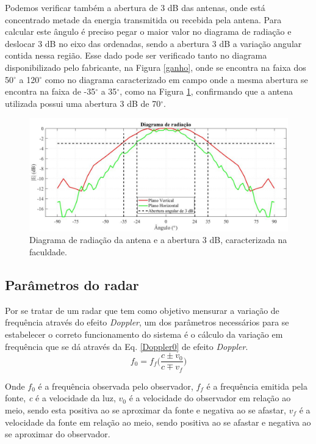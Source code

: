 Podemos verificar também a abertura de 3 dB das antenas, onde está concentrado metade da energia transmitida ou recebida pela antena. Para calcular este ângulo é preciso pegar o maior valor no diagrama de radiação e deslocar 3 dB no eixo das ordenadas, sendo a abertura 3 dB a variação angular contida nessa região. Esse dado pode ser verificado tanto no diagrama disponibilizado pelo fabricante, na Figura \ref{ganho}, onde se encontra na faixa dos 50$^{\circ}$ a 120$^{\circ}$ como no diagrama caracterizado em campo onde a mesma abertura se encontra na faixa de -35$^{\circ}$ a 35$^{\circ}$, como na Figura \ref{dr}, confirmando que a antena utilizada possui uma abertura 3 dB de 70$^{\circ}$. 

\begin{figure}[H]
    \centering
   \includegraphics[scale = 0.3]{figuras/gir.png}
   \caption{Diagrama de radiação da antena e a
abertura 3 dB, caracterizada na faculdade.}
   \label{dr}
    \end{figure}


\subsection{Parâmetros do radar}


 Por se tratar de um radar que tem como objetivo mensurar a variação de frequência através do efeito \emph{Doppler}, um dos parâmetros necessários para se estabelecer o correto funcionamento do sistema é o cálculo da variação em frequência que se dá através da Eq. \ref{Doppler0} de efeito \emph{Doppler}\cite{young2009fisica}.
\begin{equation}\label{Doppler0} 
  f_0 = f_f \Big(\frac{c \pm v_0}{c \mp v_f} \Big)
\end{equation} 

Onde $f_0$ é a frequência observada pelo observador, $f_f$ é a frequência emitida pela fonte, \emph{c} é a velocidade da luz, $v_0$ é a velocidade do observador em relação ao meio, sendo esta positiva ao se aproximar da fonte e negativa ao se afastar, $v_f$ é a velocidade da fonte em relação ao meio, sendo positiva ao se afastar e negativa ao se aproximar do observador.

